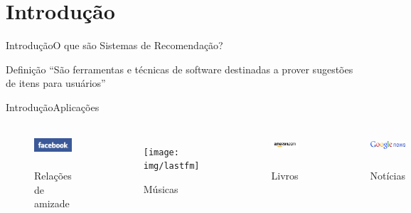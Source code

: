 \section[Introdução]{Introdução}
\begin{frame}{Introdução}{O que são Sistemas de Recomendação?}
\begin{block}{Definição}
``São ferramentas e técnicas de software destinadas a prover sugestões de itens para usuários'' \cite{ricci2011introduction-chap1}
\end{block}
\end{frame}

\begin{frame}{Introdução}{Aplicações}
\begin{columns}[c] %


\begin{figure}[ht]
    \begin{center}
    \includegraphics[height=30px]{img/facebook}

    Relações de amizade
    \end{center}
\end{figure}

\begin{figure}[ht]
    \begin{center}
    \texttt{[image: img/lastfm]}

    Músicas
    \end{center}
\end{figure}


\begin{figure}[ht]
    \begin{center}
    \includegraphics[height=30px]{img/amazon}

    Livros
    \end{center}
\end{figure}

\begin{figure}[ht]
    \begin{center}
    \includegraphics[height=30px]{img/google-news}

    Notícias
    \end{center}
\end{figure}

\end{columns}
\end{frame}

